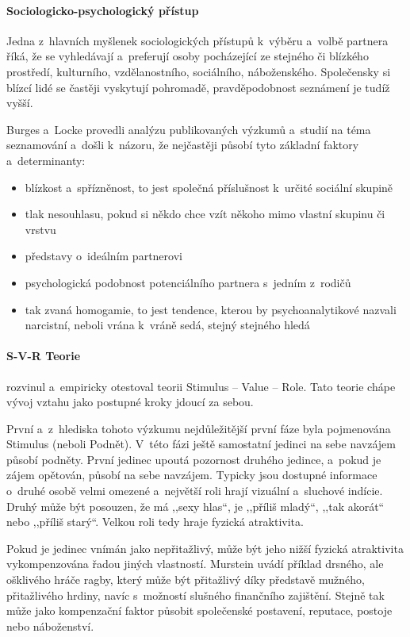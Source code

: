 \documentclass[a4paper, 12pt, notitlepage, oneside, numbers=noenddot]{report}
\begin{document}
\paragraph{Sociologicko-psychologický přístup}
Jedna z~hlavních myšlenek sociologických pří\-stu\-pů \citep{Planava1998}
k~výběru a~volbě partnera říká, že se vyhledávají a~preferují \hbox{osoby}
pocházející ze stejného či blízkého prostředí, kulturního,
vzdělanost\-ního, sociál\-ního, nábožen\-ského.  Společensky si blízcí lidé
se častěji vyskytují pohromadě, pravděpodobnost seznámení je tudíž
vyšší.

Burges a~Locke \citep{Planava1998} provedli analýzu publikovaných
výzkumů a~studií na téma seznamování a~došli k~názoru, že nejčastěji
působí tyto základní faktory a~determinanty:

\begin{itemize}
\item blízkost a~spřízněnost, to jest společná příslušnost k~určité
  sociální skupině
\item tlak nesouhlasu, pokud si někdo chce vzít někoho mimo vlastní
  skupinu či vrstvu
\item představy o~ideálním partnerovi
\item psychologická podobnost potenciálního partnera s~jedním z~rodičů
\item tak zvaná homogamie, to jest tendence, kterou by
  psychoanalytikové nazvali narcistní, neboli vrána k~vráně sedá,
  stejný stejného hledá
\end{itemize}
\paragraph[S{}--V{}--R Teorie]{S-V-R Teorie}
\citet{Murstein1970} rozvinul a~empiricky otestoval teorii
Stimulus -- Value -- Role. Tato teorie chápe vývoj vztahu jako postupné
kroky jdoucí za sebou.

První a~z~hlediska tohoto výzkumu nejdůležitější první fáze byla
pojmenována Stimulus (neboli Podnět).  V~této fázi ještě samostatní
jedinci na sebe navzájem působí podněty.  První jedinec upoutá
pozornost druhého jedince, a~pokud je zájem opětován, působí na sebe
navzájem.  Typicky jsou dostupné informace o~druhé osobě velmi
omezené a~největší roli hrají vizuální a~sluchové indície. Druhý může
být posouzen, že má ,,sexy hlas``, je ,,příliš mladý``, ,,tak akorát``
nebo ,,příliš starý``.  Velkou roli tedy hraje fyzická atraktivita.

Pokud je jedinec vnímán jako nepřitažlivý, může být jeho nižší fyzická
atraktivita vykompenzována řadou jiných vlastností.  Murstein uvádí
příklad drsného, ale ošklivého hráče ragby, který může být přitažlivý
díky představě mužného, přitažlivého hrdiny, navíc s~možností slušného
finančního zajištění.  Stejně tak může jako kompenzační faktor působit
společenské postavení, reputace, postoje nebo náboženství.
\end{document}
